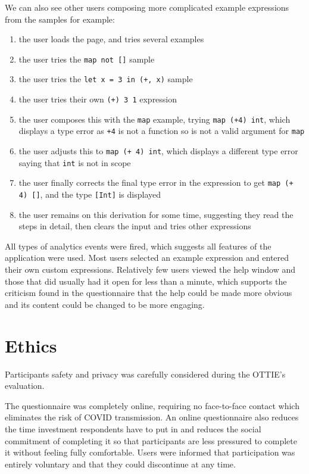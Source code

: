 \documentclass[a4paper,fleqn,oneside,12pt]{report}
\begin{document}
We can also see other users composing more complicated example expressions from the samples for example:
\begin{enumerate}
  \item the user loads the page, and tries several examples
  \item the user tries the \texttt{map not []} sample
  \item the user tries the \texttt{let x = 3 in (+, x)} sample
  \item the user tries their own \texttt{(+) 3 1} expression
  \item the user composes this with the \texttt{map} example, trying \texttt{map (+4) int}, which displays a type error as \texttt{+4} is not a function so is not a valid argument for \texttt{map}
  \item the user adjusts this to \texttt{map (+ 4) int}, which displays a different type error saying that \texttt{int} is not in scope
  \item the user finally corrects the final type error in the expression to get \texttt{map (+ 4) []}, and the type \texttt{[Int]} is displayed
  \item the user remains on this derivation for some time, suggesting they read the steps in detail, then clears the input and tries other expressions
\end{enumerate}

All types of analytics events were fired, which suggests all features of the application were used. Most users selected an example expression and entered their own custom expressions. Relatively few users viewed the help window and those that did usually had it open for less than a minute, which supports the criticism found in the questionnaire that the help could be made more obvious and its content could be changed to be more engaging.

\section{Ethics}\label{id:h.q5st3bb4afm1}

Participants safety and privacy was carefully considered during the OTTIE's evaluation.

The questionnaire was completely online, requiring no face-to-face contact which eliminates the risk of COVID transmission. An online questionnaire also reduces the time investment respondents have to put in and reduces the social commitment of completing it so that participants are less pressured to complete it without feeling fully comfortable. Users were informed that participation was entirely voluntary and that they could discontinue at any time.
\end{document}
